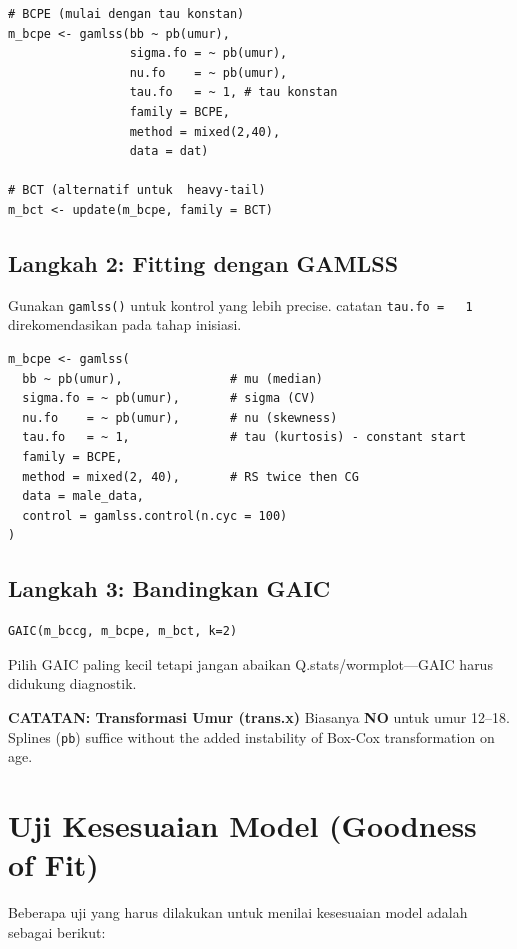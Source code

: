 \documentclass[11pt, a4paper]{article}
\begin{document}
\begin{enumerate}
\begin{lstlisting}
# BCPE (mulai dengan tau konstan)
m_bcpe <- gamlss(bb ~ pb(umur),
                 sigma.fo = ~ pb(umur),
                 nu.fo    = ~ pb(umur),
                 tau.fo   = ~ 1, # tau konstan
                 family = BCPE,
                 method = mixed(2,40),
                 data = dat)

# BCT (alternatif untuk  heavy-tail)
m_bct <- update(m_bcpe, family = BCT)
\end{lstlisting}

\subsection{Langkah 2: Fitting dengan GAMLSS}
Gunakan \texttt{gamlss()} untuk kontrol yang lebih precise. catatan \texttt{tau.fo = ~ 1} direkomendasikan pada tahap inisiasi.

\begin{lstlisting}
m_bcpe <- gamlss(
  bb ~ pb(umur),               # mu (median)
  sigma.fo = ~ pb(umur),       # sigma (CV)
  nu.fo    = ~ pb(umur),       # nu (skewness)
  tau.fo   = ~ 1,              # tau (kurtosis) - constant start
  family = BCPE,
  method = mixed(2, 40),       # RS twice then CG 
  data = male_data,
  control = gamlss.control(n.cyc = 100)
)
\end{lstlisting}

\subsection{Langkah 3: Bandingkan GAIC}
\begin{lstlisting}
GAIC(m_bccg, m_bcpe, m_bct, k=2)
\end{lstlisting}
Pilih GAIC paling kecil tetapi jangan abaikan Q.stats/wormplot—GAIC harus didukung diagnostik.

\textbf{CATATAN: Transformasi Umur (trans.x)}
Biasanya \textbf{NO} untuk umur 12--18. Splines (\texttt{pb}) suffice without the added instability of Box-Cox transformation on age.

\section{Uji Kesesuaian Model (Goodness of Fit)}
Beberapa uji yang harus dilakukan untuk menilai kesesuaian model adalah sebagai berikut:

\end{enumerate}
\end{document}

